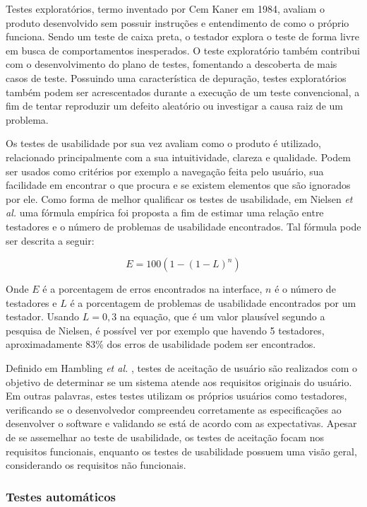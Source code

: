 Testes exploratórios, termo inventado por Cem Kaner \cite{kaner} em 1984, avaliam o produto desenvolvido sem possuir instruções e entendimento de como o próprio funciona. Sendo um teste de caixa preta, o testador explora o teste de forma livre em busca de comportamentos inesperados. O teste exploratório também contribui com o desenvolvimento do plano de testes, fomentando a descoberta de mais casos de teste. Possuindo uma característica de depuração, testes exploratórios também podem ser acrescentados durante a execução de um teste convencional, a fim de tentar reproduzir um defeito aleatório ou investigar a causa raiz de um problema.

Os testes de usabilidade por sua vez avaliam como o produto é utilizado, relacionado principalmente com a sua intuitividade, clareza e qualidade. Podem ser usados como critérios por exemplo a navegação feita pelo usuário, sua facilidade em encontrar o que procura e se existem elementos que são ignorados por ele. Como forma de melhor qualificar os testes de usabilidade, em Nielsen \emph{et al.} \cite{nielsen} uma fórmula empírica foi proposta a fim de estimar uma relação entre testadores e o número de problemas de usabilidade encontrados. Tal fórmula pode ser descrita a seguir:

\[ E = 100(1 - (1 - L)^n)\]

Onde $E$ é a porcentagem de erros encontrados na interface, $n$ é o número de testadores e $L$ é a porcentagem de problemas de usabilidade encontrados por um testador. Usando $L = 0,3$ na equação, que é um valor plausível segundo a pesquisa de Nielsen, é possível ver por exemplo que havendo 5 testadores, aproximadamente 83\% dos erros de usabilidade podem ser encontrados.

Definido em Hambling \emph{et al.} \cite{hambling}, testes de aceitação de usuário são realizados com o objetivo de determinar se um sistema atende aos requisitos originais do usuário. Em outras palavras, estes testes utilizam os próprios usuários como testadores, verificando se o desenvolvedor compreendeu corretamente as especificações ao desenvolver o software e validando se está de acordo com as expectativas. Apesar de se assemelhar ao teste de usabilidade, os testes de aceitação focam nos requisitos funcionais, enquanto os testes de usabilidade possuem uma visão geral, considerando os requisitos não funcionais.

\hypertarget{testes-automaticos}{%
\subsubsection{Testes automáticos}\label{testes-automaticos}}

